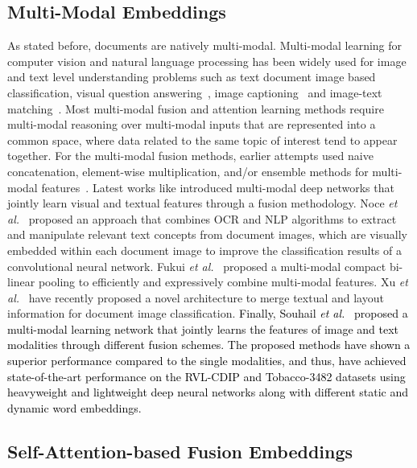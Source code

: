 \documentclass[twocolumn]{svjour3}
\newcommand{\etal}{\textit{et al.}}
\begin{document}
\subsection{Multi-Modal Embeddings}
As stated before, documents are natively multi-modal. Multi-modal learning for computer vision and natural language processing has been widely used for image and text level understanding problems such as text document image based classification, visual question answering~\cite{Zhou2015SimpleBF, Yang2016StackedAN}, image captioning~\cite{8578734} and image-text matching~\cite{Li2019VisualSR}. Most multi-modal fusion and attention learning methods require multi-modal reasoning over multi-modal inputs that are represented into a common space, where data related to the same topic of interest tend to appear together. For the multi-modal fusion methods, earlier attempts used naive concatenation, element-wise multiplication, and/or ensemble methods for multi-modal features~\cite{Gallo2018ImageAE, Sierra2018CombiningTA, zahavy2016picture, Yang2019ExploringDM}. Latest works like \cite{audebert2019multimodal, Asim2019TwoSD} introduced multi-modal deep networks that jointly learn visual and textual features through a fusion methodology. Noce \etal~\cite{Noce2016EmbeddedTC} proposed an approach that combines OCR and NLP algorithms to extract and manipulate relevant text concepts from document images, which are visually embedded within each document image to improve the classification results of a convolutional neural network. Fukui \etal~\cite{Fukui2016MultimodalCB} proposed a multi-modal compact bi-linear pooling to efficiently and expressively combine multi-modal features. Xu \etal~\cite{Xu2020LayoutLMPO, Xu2020LayoutLMv2MP} have recently proposed a novel architecture to merge textual and layout information for document image classification. 
\textcolor{black}{Finally, Souhail \etal~\cite{souhailbakkali, 9191268} proposed a multi-modal learning network that jointly learns the features of image and text modalities through different fusion schemes. The proposed methods have shown a superior performance compared to the single modalities, and thus, have achieved state-of-the-art performance on the RVL-CDIP and Tobacco-3482 datasets using heavyweight and lightweight deep neural networks along with different static and dynamic word embeddings.}

\subsection{Self-Attention-based Fusion Embeddings}
\end{document}
